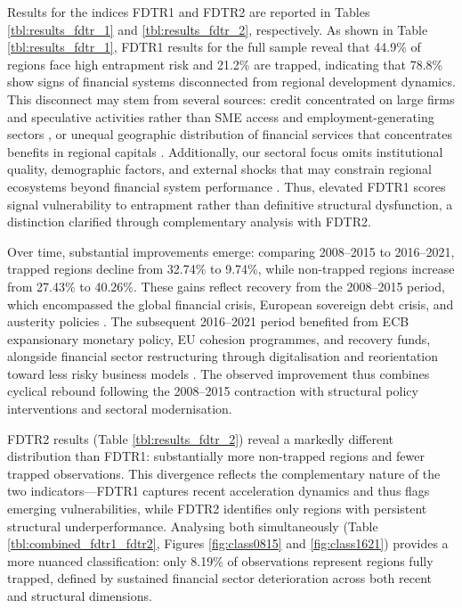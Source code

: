 \documentclass[a4paper,11pt,oneside]{article}
\begin{document}
Results for the indices FDTR1 and FDTR2 are reported in Tables \ref{tbl:results_fdtr_1} and \ref{tbl:results_fdtr_2}, respectively. As shown in Table \ref{tbl:results_fdtr_1}, FDTR1 results for the full sample reveal that 44.9\% of regions face high entrapment risk and 21.2\% are trapped, indicating that 78.8\% show signs of financial systems disconnected from regional development dynamics. This disconnect may stem from several sources: credit concentrated on large firms and speculative activities rather than SME access and employment-generating sectors \citep{beck2007finance, philippon2015has}, or unequal geographic distribution of financial services that concentrates benefits in regional capitals \citep{guiso2009does, iammarino2019regional}. Additionally, our sectoral focus omits institutional quality, demographic factors, and external shocks that may constrain regional ecosystems beyond financial system performance \citep{rodriguez2013institutions}. Thus, elevated FDTR1 scores signal vulnerability to entrapment rather than definitive structural dysfunction, a distinction clarified through complementary analysis with FDTR2.


Over time, substantial improvements emerge: comparing 2008--2015 to 2016--2021, trapped regions decline from 32.74\% to 9.74\%, while non-trapped regions increase from 27.43\% to 40.26\%. These gains reflect recovery from the 2008--2015 period, which encompassed the global financial crisis, European sovereign debt crisis, and austerity policies \citep{lane2012european}. The subsequent 2016--2021 period benefited from ECB expansionary monetary policy, EU cohesion programmes, and recovery funds, alongside financial sector restructuring through digitalisation and reorientation toward less risky business models \citep{acharya2019whatever, philippon2016fintech}. The observed improvement thus combines cyclical rebound following the 2008--2015 contraction with structural policy interventions and sectoral modernisation.




FDTR2 results (Table \ref{tbl:results_fdtr_2}) reveal a markedly different distribution than FDTR1: substantially more non-trapped regions and fewer trapped observations. This divergence reflects the complementary nature of the two indicators---FDTR1 captures recent acceleration dynamics and thus flags emerging vulnerabilities, while FDTR2 identifies only regions with persistent structural underperformance. Analysing both simultaneously (Table \ref{tbl:combined_fdtr1_fdtr2}, Figures \ref{fig:class0815} and \ref{fig:class1621}) provides a more nuanced classification: only 8.19\% of observations represent regions fully trapped, defined by sustained financial sector deterioration across both recent and structural dimensions. 
\end{document}
